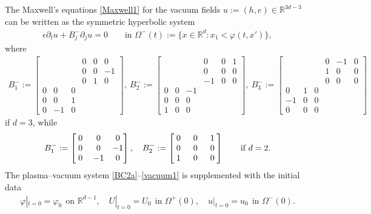 \documentclass[twoside,11pt]{article}
\numberwithin{equation}{section}
\def\p{\partial}
\newcommand\w[1]{\makebox[1em]{$#1$}}
\begin{document}
	The Maxwell's equations \eqref{Maxwell1} for the vacuum fields $u:=(h,e)\in \mathbb{R}^{3d-3}$ can be written as the symmetric hyperbolic system
	\begin{align}\label{vacuum1}
		\epsilon \p_t u+%
		 B_j^-\p_j u=0\qquad\textrm{in }\Omega^-(t):=\{x\in\mathbb{R}^d: x_1< \varphi(t,x') \},
	\end{align}
	where
\begin{gather}
\nonumber %
	B_1^-:=\begin{bmatrix}
		&  & &0 & 0 &0 \\
		&   & & 0 & 0 &-1 \\
		&   & & 0 & 1 &0 \\
		0 & 0 &0 & &  &  \\
		0 & 0 &1 &  &  &  \\
		0 &-1 &0& &  &
	\end{bmatrix},
	\
	B_2^-:=\begin{bmatrix}
		&  & &0 & 0 &1 \\
		&   & & 0 & 0 &0 \\
		&   & & -1 & 0 &0 \\
		0&0& -1& &   & \\
		0 & 0 &0 &  &  & \\
		1 & 0 &0 &  &    &
	\end{bmatrix},
	\
	B_3^-:=\begin{bmatrix}
		&  & & 0& -1 &0\\
		&  && 1& 0 &0\\
		&  && 0 & 0 &0 \\
		0 & 1 &0 & &  & \\
		-1 & 0 &0 & &  & \\
		0 & 0 &0&  &  &
	\end{bmatrix} %
\end{gather}
if $d=3$, while
\begin{align}
\nonumber %
	B_1^-:=\begin{bmatrix}
		0 & 0 &0 \\
		0 & 0 &-1 \\
		\w{0} & -1 &0
	\end{bmatrix},
	\quad
	B_2^-:=\begin{bmatrix}
		0 & 0 &1 \\
		0 & 0 &0 \\
		\w{1} & \w{0} &\w{0}
	\end{bmatrix}\qquad \textrm{if }d=2.
\end{align}	
The plasma--vacuum system \eqref{BC2a}--\eqref{vacuum1} is supplemented with the initial data
\begin{align} \label{IC1}
		\varphi|_{t=0}=\varphi_0\ \ \textrm{on }\mathbb{R}^{d-1},\quad
	U|_{t=0}=U_0\ \ \textrm{in }\Omega^+(0),\quad
	u|_{t=0}=u_0\  \ \textrm{in }\Omega^-(0).
\end{align}
	
\end{document}
